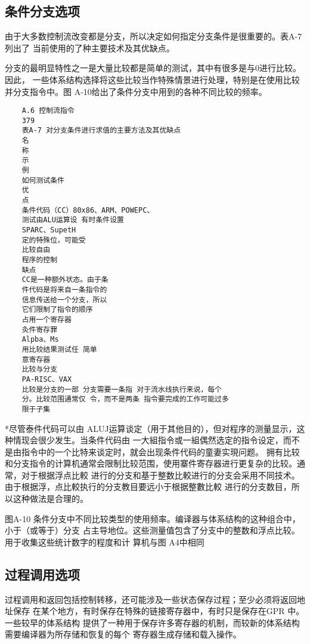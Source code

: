 \subsection{条件分支选项}
由于大多数控制流改变都是分支，所以决定如何指定分支条件是很重要的。表A-7列出了
当前使用的了种主要技术及其优缺点。

分支的最明显特性之一是大量比较都是简单的测试，其中有很多是与0进行比较。因此，
一些体系结构选择将这些比较当作特殊情景进行处理，特别是在使用比较并分支指令中。图
A-10给出了条件分支中用到的各种不同比较的频率。

\begin{verbatim}
    A.6 控制流指令
    379
    表A-7 对分支条件进行求值的主要方法及其优缺点
    名
    称
    示
    例
    如何测试条件
    优
    点
    条件代码（CC）80x86、ARM、POWEPC、
    测试由ALU运算设 有时条件设置
    SPARC、SupetH
    定的特殊位，可能受
    比较自由
    程序的控制
    缺点
    CC是一种额外状态。由于条
    件代码是将来自一条指令的
    信息传送给一个分支，所以
    它们限制了指令的顺序
    占用一个寄存器
    灸件寄存罪
    Alpba、Ms
    用比较结果测试任 简单
    意寄存器
    比较与分支
    PA-RISC、VAX
    比较是分支的一部 分支需要一条指 对于流水线执行来说，每个
    分。比较范围通常仅 令，而不是两条 指令要完成的工作可能过多
    限于子集
\end{verbatim}
*尽管泰件代码可以由 ALUJ运算谈定（用于其他目的），但对程序的测量显示，这种情现会很少发生。当条件代码由
一大組指令或一組偶然选定的指令设定，而不是由指令中的一个比特来谈定时，就会出现条件代码的童妻实現问题。
拥有比较和分支指令的计算机通常会限制比较范围，使用寨件寄存器进行更复杂的比较。通常，对于根据浮点比較
进行的分支和基于整数比較进行的分支会采用不同技术。由于根据浮，点比較执行的分支教目要远小于根据整數比較
进行的分支数目，所以这种做法是合理的。

图A-10 条件分支中不同比较类型的使用频率。编译器与体系结构的这种组合中，小于（或等于）分支
占主导地位。这些测量值包含了分支中的整数和浮点比较。用于收集这些统计数字的程度和计
算机与图 A4中相同

\subsection{过程调用选项}
过程调用和返回包括控制转移，还可能涉及一些状态保存过程；至少必须将返回地址保存
在某个地方，有时保存在特殊的链接寄存器中，有时只是保存在GPR 中。一些较早的体系结构
提供了一种用于保存许多寄存器的机制，而较新的体系结构需要编译器为所存储和恢复的每个
寄存器生成存储和载入操作。

